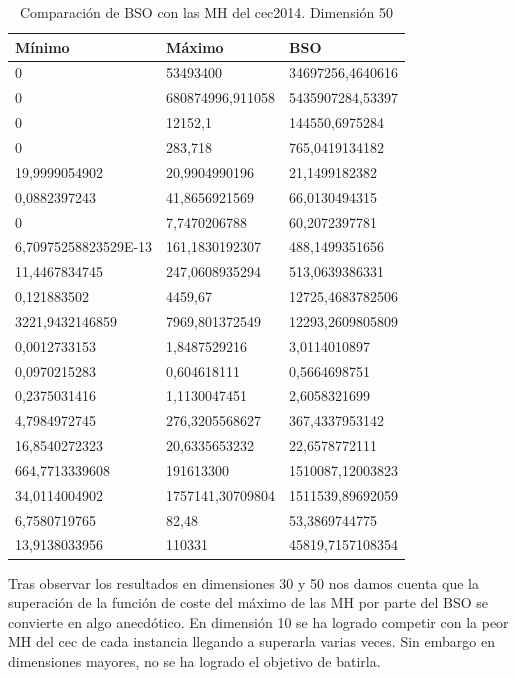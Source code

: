 \begin{table}[htbp]
	\begin{center}
		\begin{tabular}{|l|l|l|}
			\hline
			Mínimo & Máximo & BSO \\
			\hline \hline
			0 & 53493400 & 34697256,4640616 \\ \hline
			0 & 680874996,911058 & 5435907284,53397 \\ \hline
			0 & 12152,1 & 144550,6975284 \\ \hline
			0 & 283,718 & 765,0419134182 \\ \hline
			19,9999054902 & 20,9904990196 & 21,1499182382 \\ \hline
			0,0882397243 & 41,8656921569 & 66,0130494315 \\ \hline
			0 & 7,7470206788 & 60,2072397781 \\ \hline
			6,70975258823529E-13 & 161,1830192307 & 488,1499351656 \\ \hline
			11,4467834745 & 247,0608935294 & 513,0639386331 \\ \hline
			0,121883502 & 4459,67 & 12725,4683782506 \\ \hline
			3221,9432146859 & 7969,801372549 & 12293,2609805809 \\ \hline
			0,0012733153 & 1,8487529216 & 3,0114010897 \\ \hline
			0,0970215283 & 0,604618111 & 0,5664698751 \\ \hline
			0,2375031416 & 1,1130047451 & 2,6058321699 \\ \hline
			4,7984972745 & 276,3205568627 & 367,4337953142 \\ \hline
			16,8540272323 & 20,6335653232 & 22,6578772111 \\ \hline
			664,7713339608 & 191613300 & 1510087,12003823 \\ \hline
			34,0114004902 & 1757141,30709804 & 1511539,89692059 \\ \hline
			6,7580719765 & 82,48 & 53,3869744775 \\ \hline
			13,9138033956 & 110331 & 45819,7157108354 \\ \hline
			
			
		\end{tabular}
		\caption{Comparación de BSO con las MH del cec2014. Dimensión 50}
		\label{tabla:Dimension50Comparativa}
	\end{center}
\end{table}

\newpage

Tras observar los resultados en dimensiones 30 y 50 nos damos cuenta que la superación de la función de coste del máximo de las MH por parte del BSO se convierte en algo anecdótico. En dimensión 10 se ha logrado competir con la peor MH del cec de cada instancia llegando a superarla varias veces. Sin embargo en dimensiones mayores, no se ha logrado el objetivo de batirla.
\newpage


